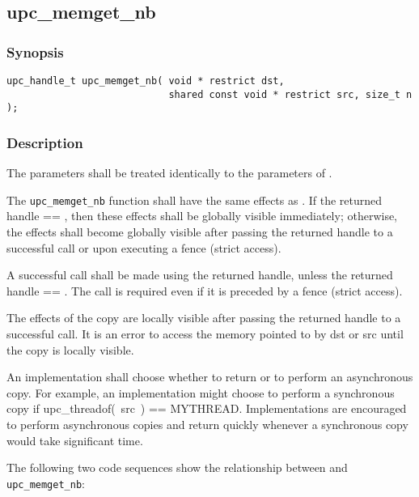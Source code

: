 \newpage
\subsection{upc\_memget\_nb}
\def\function{{\tt upc\_memget\_nb}}

\subsubsection{Synopsis}

\begin{verbatim}
upc_handle_t upc_memget_nb( void * restrict dst,
                            shared const void * restrict src, size_t n );
\end{verbatim}

\subsubsection{Description}

\npf The parameters shall be treated identically to the parameters of
\memget{}.

\np The \function{} function shall have the same effects as \memget{}.
If the returned handle == \complete{}, then these effects shall be globally
visible immediately; otherwise, the effects shall become globally visible after
passing the returned handle to a successful \gsync{} call or upon executing a
fence (strict access).

\np A successful \gsync{} call shall be made using the returned handle,
unless the returned handle == \complete{}.  The call is required even if it is
preceded by a fence (strict access).

\np The effects of the copy are locally visible after passing the
returned handle to a successful \lsync{} call.  It is an error to access the
memory pointed to by dst or src until the copy is locally visible.

\np An implementation shall choose whether to return \complete{} or to
perform an asynchronous copy.  For example, an implementation might choose to
perform a synchronous copy if upc\_threadof(~src~) == MYTHREAD.  Implementations
are encouraged to perform asynchronous copies and return quickly whenever a
synchronous copy would take significant time.

\np The following two code sequences show the relationship between
\memget{} and \function{}:

